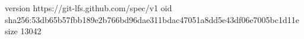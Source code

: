 version https://git-lfs.github.com/spec/v1
oid sha256:53db65b57fbb189e2b766bd96dae311bdac47051a8dd5e43df06e7005bc1d11e
size 13042
